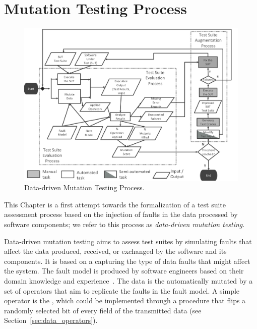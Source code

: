 
\section{Mutation Testing Process}
\label{sec:dataProcess}

	\begin{figure}
	\centering
		\includegraphics[width=\textwidth]{images/dataProcess}
		\caption{Data-driven Mutation Testing Process.}
		\label{fig:data:process}
	\end{figure}



This Chapter is a first attempt towards the formalization of a test suite assessment process based on the injection of faults in the data processed by software components; we refer to this process as \emph{data-driven mutation testing}. 

Data-driven mutation testing aims to assess test suites by simulating faults that affect the data produced, received, or exchanged by the software and its components.
It is based on a  capturing the type of data faults that might affect the system. The fault model is produced by software engineers based on their domain knowledge and experience~\cite{di2015generating}.  The data is the automatically mutated by a set of operators that aim to replicate the faults in the fault model. A simple operator is the , which could be implemented through a procedure that flips a randomly selected bit of every field of the transmitted data (see Section~\ref{sec:data_operators}).


